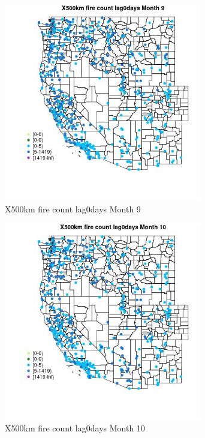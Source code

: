 \begin{figure} 
\centering  
\includegraphics[width=0.77\textwidth]{Code_Outputs/Report_ML_input_PM25_Step4_part_e_de_duplicated_aves_compiled_2019-05-14wNAs_MapObsMo9X500km_fire_count_lag0days.jpg} 
\caption{\label{fig:Report_ML_input_PM25_Step4_part_e_de_duplicated_aves_compiled_2019-05-14wNAsMapObsMo9X500km_fire_count_lag0days}X500km fire count lag0days Month 9} 
\end{figure} 
 

\clearpage 

\begin{figure} 
\centering  
\includegraphics[width=0.77\textwidth]{Code_Outputs/Report_ML_input_PM25_Step4_part_e_de_duplicated_aves_compiled_2019-05-14wNAs_MapObsMo10X500km_fire_count_lag0days.jpg} 
\caption{\label{fig:Report_ML_input_PM25_Step4_part_e_de_duplicated_aves_compiled_2019-05-14wNAsMapObsMo10X500km_fire_count_lag0days}X500km fire count lag0days Month 10} 
\end{figure} 
 

